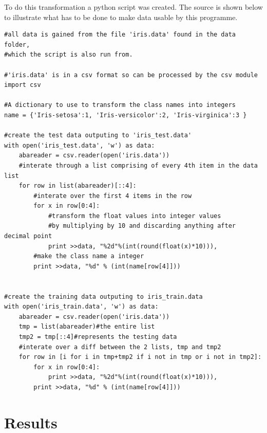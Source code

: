 \documentclass[11pt]{article}
\begin{document}
To do this transformation a python script was created. The source is
shown below to illustrate what has to be done to make data usable by
this programme. 

\lstset{language=Python}
\begin{lstlisting}
#all data is gained from the file 'iris.data' found in the data folder,
#which the script is also run from.

#'iris.data' is in a csv format so can be processed by the csv module
import csv

#A dictionary to use to transform the class names into integers
name = {'Iris-setosa':1, 'Iris-versicolor':2, 'Iris-virginica':3 }

#create the test data outputing to 'iris_test.data'
with open('iris_test.data', 'w') as data:
    abareader = csv.reader(open('iris.data'))
    #interate through a list comprising of every 4th item in the data list
    for row in list(abareader)[::4]:
        #interate over the first 4 items in the row
        for x in row[0:4]:
            #transform the float values into integer values
            #by multiplying by 10 and discarding anything after decimal point
            print >>data, "%2d"%(int(round(float(x)*10))),
        #make the class name a integer
        print >>data, "%d" % (int(name[row[4]]))


#create the training data outputing to iris_train.data
with open('iris_train.data', 'w') as data:
    abareader = csv.reader(open('iris.data'))
    tmp = list(abareader)#the entire list
    tmp2 = tmp[::4]#represents the testing data
    #interate over a diff between the 2 lists, tmp and tmp2
    for row in [i for i in tmp+tmp2 if i not in tmp or i not in tmp2]:
        for x in row[0:4]:
            print >>data, "%2d"%(int(round(float(x)*10))),
        print >>data, "%d" % (int(name[row[4]]))
\end{lstlisting}
\section{Results}
\label{sec-5}
\end{document}
